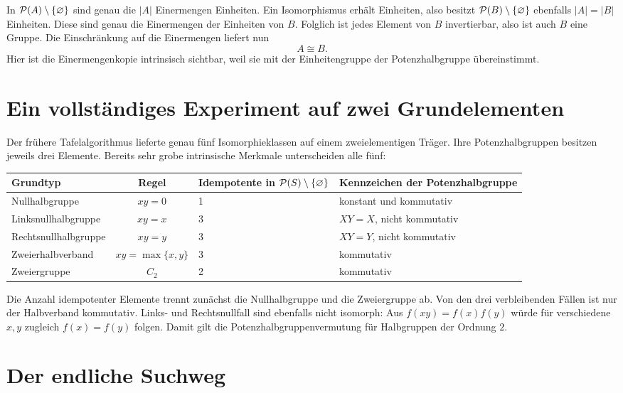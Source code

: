 \documentclass[main.tex]{subfiles}
\begin{document}
In \(\mathcal{P}(A)\setminus\{\varnothing\}\) sind genau die \(|A|\) Einermengen Einheiten.  Ein
Isomorphismus erhält Einheiten, also besitzt \(\mathcal{P}(B)\setminus\{\varnothing\}\) ebenfalls
\(|A|=|B|\) Einheiten.  Diese sind genau die Einermengen der Einheiten von
\(B\).  Folglich ist jedes Element von \(B\) invertierbar, also ist auch
\(B\) eine Gruppe.  Die Einschränkung auf die Einermengen liefert nun
\[
  A\cong B.
\]
Hier ist die Einermengenkopie intrinsisch sichtbar, weil sie mit der
Einheitengruppe der Potenzhalbgruppe übereinstimmt.

\section{Ein vollständiges Experiment auf zwei Grundelementen}

Der frühere Tafelalgorithmus lieferte genau fünf Isomorphieklassen auf einem
zweielementigen Träger.  Ihre Potenzhalbgruppen besitzen jeweils drei
Elemente.  Bereits sehr grobe intrinsische Merkmale unterscheiden alle fünf:
\begin{center}
\small
\begin{tabularx}{\textwidth}{@{}lclX@{}}
\toprule
\textbf{Grundtyp}&\textbf{Regel}&
\textbf{Idempotente in \(\mathcal{P}(S)\setminus\{\varnothing\}\)}&\textbf{Kennzeichen der Potenzhalbgruppe}\\
\midrule
Nullhalbgruppe&\(xy=0\)&1&konstant und kommutativ\\
Linksnullhalbgruppe&\(xy=x\)&3&\(XY=X\), nicht kommutativ\\
Rechtsnullhalbgruppe&\(xy=y\)&3&\(XY=Y\), nicht kommutativ\\
Zweierhalbverband&\(xy=\max\{x,y\}\)&3&kommutativ\\
Zweiergruppe&\(C_2\)&2&kommutativ\\
\bottomrule
\end{tabularx}
\end{center}
Die Anzahl idempotenter Elemente trennt zunächst die Nullhalbgruppe und die
Zweiergruppe ab.  Von den drei verbleibenden Fällen ist nur der Halbverband
kommutativ.  Links- und Rechtsnullfall sind ebenfalls nicht isomorph: Aus
\(f(xy)=f(x)f(y)\) würde für verschiedene \(x,y\) zugleich
\(f(x)=f(y)\) folgen.  Damit gilt die Potenzhalbgruppenvermutung für
Halbgruppen der Ordnung \(2\).

\section{Der endliche Suchweg}
\end{document}
